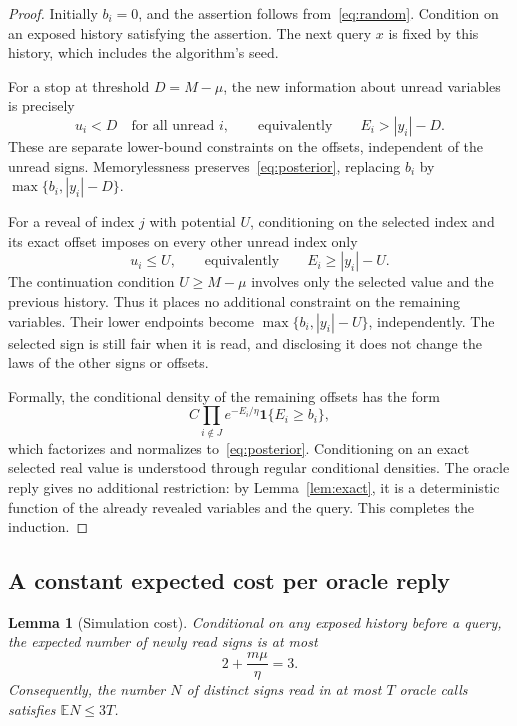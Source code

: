 \documentclass[11pt,a4paper]{article}
\newtheorem{lemma}[theorem]{Lemma}
\theoremstyle{definition}
\theoremstyle{remark}
\newcommand{\E}{\mathbb E}
\begin{document}
\begin{proof}
Initially $b_i=0$, and the assertion follows from~\eqref{eq:random}.
Condition on an exposed history satisfying the assertion. The next query
$x$ is fixed by this history, which includes the algorithm's seed.

For a stop at threshold $D=M-\mu$, the new information about unread variables
is precisely
\[
  u_i<D\quad\text{for all unread }i,
  \qquad\text{equivalently}\qquad E_i>|y_i|-D.
\]
These are separate lower-bound constraints on the offsets, independent of
the unread signs. Memorylessness preserves~\eqref{eq:posterior}, replacing
$b_i$ by $\max\{b_i,|y_i|-D\}$.

For a reveal of index $j$ with potential $U$, conditioning on the selected
index and its exact offset imposes on every other unread index only
\[
  u_i\le U,
  \qquad\text{equivalently}\qquad E_i\ge|y_i|-U.
\]
The continuation condition $U\ge M-\mu$ involves only the selected value
and the previous history. Thus it places no additional constraint on the
remaining variables. Their lower endpoints become
$\max\{b_i,|y_i|-U\}$, independently. The selected sign is still fair when
it is read, and disclosing it does not change the laws of the other signs
or offsets.

Formally, the conditional density of the remaining offsets has the form
\[
  C\prod_{i\notin J}e^{-E_i/\eta}\mathbf1\{E_i\ge b_i\},
\]
which factorizes and normalizes to~\eqref{eq:posterior}.
Conditioning on an exact selected real value is understood through regular
conditional densities. The oracle reply gives no additional restriction:
by Lemma~\ref{lem:exact}, it is a deterministic function of the already
revealed variables and the query. This completes the induction.
\end{proof}

\subsection{A constant expected cost per oracle reply}

\begin{lemma}[Simulation cost]\label{lem:cost}
Conditional on any exposed history before a query, the expected number of
newly read signs is at most
\begin{equation}\label{eq:cost}
  2+\frac{m\mu}{\eta}=3.
\end{equation}
Consequently, the number $N$ of distinct signs read in at most $T$ oracle
calls satisfies $\E N\le3T$.
\end{lemma}
\end{document}
